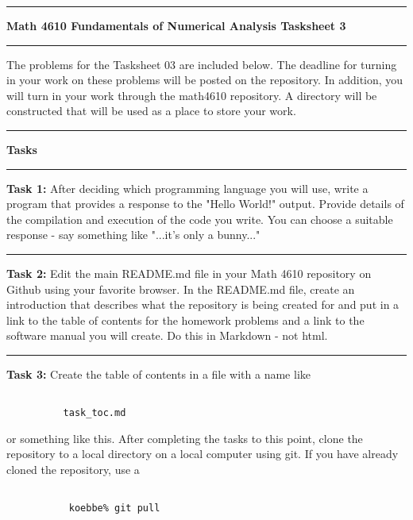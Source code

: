 \documentclass[10pt,fleqn]{article}
\begin{document}
\vskip0.1in\hrule\vskip0.1in \noindent
{\bf{\Large Math 4610 Fundamentals of Numerical Analysis Tasksheet 3}}
\vskip0.1in\hrule\vskip0.1in \noindent
The problems for the Tasksheet 03 are included below. The deadline for turning
in your work on these problems will be posted on the repository. In addition,
you will turn in your work through the math4610 repository. A directory will be
constructed that will be used as a place to store your work.
\vskip0.1in\hrule\vskip0.1in \noindent
{\bf{\large Tasks}}
\vskip0.1in\hrule\vskip0.1in \noindent
\begin{trivlist}
  \item[\bf Task 1:] After deciding which programming language you will use,
        write a program that provides a response to the "Hello World!" output.
        Provide details of the compilation and execution of the code you write.
        You can choose a suitable response - say something like "...it's only a
        bunny..."
\vskip0.1in\hrule\vskip0.1in \noindent
  \item[\bf Task 2:] Edit the main README.md file in your Math 4610 repository
        on Github using your favorite browser. In the README.md file, create an
        introduction that describes what the repository is being created for and
        put in a link to the table of contents for the homework problems and a
        link to the software manual you will create. Do this in Markdown - not
        html.
\vskip0.1in\hrule\vskip0.1in \noindent
  \item[\bf Task 3:] Create the table of contents in a file with a name like
        \begin{verbatim}

          task_toc.md

        \end{verbatim}
        or something like this. After completing the tasks to this point, clone
        the repository to a local directory on a local computer using git. If
        you have already cloned the repository, use a
        \begin{verbatim}

           koebbe% git pull


\end{verbatim}
\end{trivlist}
\end{document}
